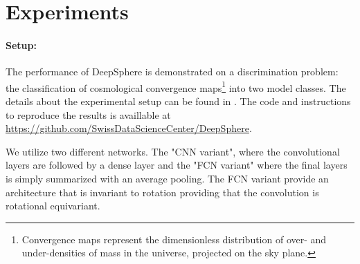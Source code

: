 \documentclass{article} %
\newcommand{\1}{\b{1}}              %
\newcommand{\0}{\b{0}}              %
\newcommand{\todo}[1]{{\color[rgb]{.6,.1,.6}{#1}}}
\begin{document}
\section{Experiments}


\paragraph{Setup:}
The performance of DeepSphere is demonstrated on a discrimination problem: the classification of cosmological convergence maps\footnote{Convergence maps represent the dimensionless distribution of over- and under-densities of mass in the universe, projected on the sky plane.} into two model classes. 
The details about the experimental setup can be found in \cite{perraudin2018deepsphere}. The code and instructions to reproduce the results is availlable at \url{https://github.com/SwissDataScienceCenter/DeepSphere}.


We utilize two different networks. The "CNN variant", where the convolutional layers are followed by a dense layer and the "FCN variant" where the final layers is simply summarized with an average pooling. 
The FCN variant provide an architecture that is invariant to rotation providing that the convolution is rotational equivariant.
\end{document}
